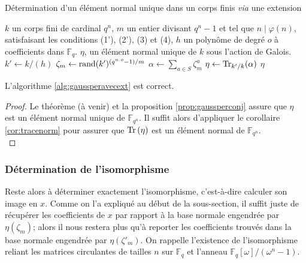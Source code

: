\documentclass[a4paper]{article} %
\numberwithin{section}{part}
\numberwithin{equation}{section}
\newcommand\GF[1]{\mathbb{F}_{#1}}
\newcommand\Tr[1]{\textup{Tr}\left(#1\right)}
\begin{document}
\begin{algorithm}
\caption{Détermination d'un élément normal unique dans un corps finis
\textit{via} une extension}
\label{alg:gaussperavecext}
\begin{algorithmic}[1]
\REQUIRE $k$ un corps fini de cardinal $q^n$, $m$ un entier divisant $q^n -
1$ et tel que $n\mid\varphi(n)$, satisfaisant les conditions (1'), (2'), (3) et
(4), $h$ un polynôme de degré $o$ à coefficients dans $\GF{q}$.
\ENSURE $\eta$, un élément normal unique de $k$ sous l'action de Galois.
\bigskip
\STATE $k' \leftarrow k/(h)$
\REPEAT
    \STATE $\zeta_m \leftarrow \textup{rand}(k')^{(q^{n.o} - 1)/m}$
\STATE $\alpha \leftarrow \sum_{a\in S}{\zeta_m^a}$
\STATE $\eta \leftarrow \textup{Tr}_{k'/k}(\alpha)$
\RETURN $\eta$
\end{algorithmic}
\end{algorithm}

\begin{prop} 
L'algorithme \ref{alg:gaussperavecext} est correct.
\end{prop}
\begin{proof}
Le théorème (à venir) et la proposition \ref{prop:gaussperconj} assure que
$\eta$ est un élément normal unique de $\GF{q^{n}}$. Il suffit alors
d'appliquer le corollaire \ref{cor:tracenorm} pour assurer que $\Tr{\eta}$ est
un élément normal de $\GF{q^n}$.\\
\end{proof}

\subsubsection*{Détermination de l'isomorphisme}
Reste alors à déterminer exactement l'isomorphisme, c'est-à-dire calculer son
image en $x$. Comme on l'a expliqué au début de la sous-section, il suffit juste
de récupérer les coefficients de $x$ par rapport à la base normale engendrée par
$\eta(\zeta_m)$; alors il nous restera plus qu'à reporter les coefficients 
trouvés dans la base normale engendrée par $\eta(\zeta'_m)$. On rappelle
l'existence de l'isomorphisme reliant les matrices circulantes de tailles $n$ 
sur $\GF{q}$ et l'anneau $\GF{q}[\omega]/(\omega^n - 1)$.
\end{document}
